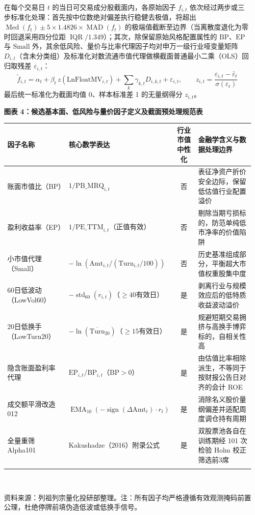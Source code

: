 \documentclass[12pt,a4paper]{article}
\newcommand{\exhibitcap}[1]{{\sffamily\bfseries\fontsize{9.6pt}{12.5pt}\selectfont\textcolor{Primary}{#1}}\\[2pt]}
\newcommand{\exhibitnote}[1]{{\fontsize{7.5pt}{10pt}\selectfont\color{GrayNote}#1\par}}
\begin{document}
在每个交易日 $t$ 的当日可交易成分股截面内，各原始因子 $f_{i,t}$ 依次经过两步或三步标准化处理：首先按中位数绝对偏差执行稳健去极值，将超出 $\operatorname{Med}(f_t) \pm 5 \times 1.4826 \times \operatorname{MAD}(f_t)$ 的极端值截断至边界（当离散度退化为零时回退采用四分位距 $\operatorname{IQR}/1.349$）；其次，除保留原始风格配置属性的 $\text{BP}$、$\text{EP}$ 与 $\text{Small}$ 外，其余低风险、量价与比率代理因子均对申万一级行业哑变量矩阵 $D_{i,t}$（含未分类组）及标准化对数流通市值代理做横截面普通最小二乘（OLS）回归取残差 $\varepsilon_{i,t}$：
\begin{equation}
\tilde{f}_{i,t} = \alpha_t + \beta_t \, z\!\left(\text{LnFloatMV}_{i,t}\right) + \sum_{k} \gamma_{k,t} D_{i,k,t} + \varepsilon_{i,t}, \qquad z_{i,t} = \frac{\varepsilon_{i,t} - \bar{\varepsilon}_t}{\sigma(\varepsilon_t)}
\end{equation}
最后统一标准化为截面均值 0、样本标准差 1 的无量纲得分 $z_{i,t}$。

\vspace{4pt}
\noindent\begin{minipage}{\textwidth}
\setlength{\parindent}{0pt}\setlength{\tabcolsep}{3.8pt}
\exhibitcap{图表 4：候选基本面、低风险与量价因子定义及截面预处理规范表}
\fontsize{7.8pt}{10.6pt}\selectfont
\begin{tabularx}{\textwidth}{@{}l l c X@{}}
  \arrayrulecolor{Primary}\toprule[1.0pt]
  \rowcolor{TblHdr}
  \textbf{\sffamily 因子名称} & \textbf{\sffamily 核心数学表达} & \textbf{\sffamily 行业市值中性化} & \textbf{\sffamily 金融学含义与数据处理边界} \\
  \midrule[0.5pt]
  账面市值比（BP） & $1 / \text{PB\_MRQ}_{i,t}$ & 否 & 表征净资产折价安全边际，保留低估值行业配置溢价 \\
  盈利收益率（EP） & $1 / \text{PE\_TTM}_{i,t}$（正值有效） & 否 & 剔除当期亏损标的，防范单纯低市净率的价值陷阱 \\
  小市值代理（Small） & $-\ln(\text{Amt}_{i,t} / (\text{Turn}_{i,t}/100))$ & 否 & 历史基准组成部分，平衡超大市值权重股集中度 \\
  60日低波动（LowVol60） & $-\operatorname{std}_{60}(r_{i,t})$（$\ge 40$有效日） & 是 & 剥离行业与规模效应后的低特质收益波动溢价 \\
  20日低换手（LowTurn20） & $-\ln(\overline{\text{Turn}}_{20})$（$\ge 15$有效日） & 是 & 规避短期交易拥挤与高换手博弈标的，自相关性高 \\
  隐含账面盈利率代理 & $\text{EP}_{i,t} / \text{BP}_{i,t}$（$\text{BP}>0$） & 是 & 由估值比率相除派生，不等同于按财报公告日对齐的会计 ROE \\
  成交额平滑改造012 & $\operatorname{EMA}_{10}(-\operatorname{sign}(\Delta\text{Amt}_t)\cdot r_t)$ & 是 & 消除名义股价量纲偏差并适配周度调仓持有周期 \\
  全量重筛 Alpha101 & Kakushadze（2016）附录公式 & 是 & 双股票池各自在训练期经 101 次检验 Holm 校正筛选前3席 \\
  \arrayrulecolor{Primary}\bottomrule[1.0pt]
\end{tabularx}\\[3pt]
\exhibitnote{资料来源：列祖列宗量化投研部整理。注：所有因子均严格遵循有效观测掩码前置公理，杜绝停牌前填伪造低波或低换手信号。}
\end{minipage}
\vspace{5pt}
\end{document}
